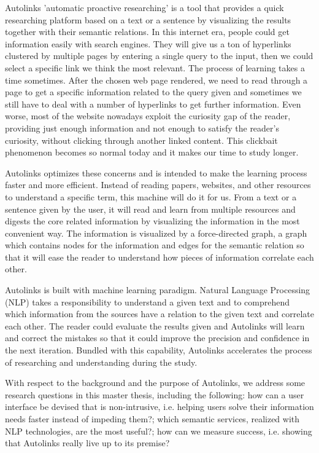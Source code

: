 \documentclass[
    fontsize=12pt,
    headings=small,
    parskip=half,           %
    bibliography=totoc,
    numbers=noenddot,       %
    open=any,               %
    ]{scrreprt}
\begin{document}
 Autolinks 'automatic proactive researching’ is a tool that provides a quick researching platform based on a text or a sentence by visualizing the results together with their semantic relations. In this internet era, people could get information easily with search engines. They will give us a ton of hyperlinks clustered by multiple pages by entering a single query to the input, then we could select a specific link we think the most relevant. The process of learning takes a time sometimes. After the chosen web page rendered, we need to read through a page to get a specific information related to the query given and sometimes we still have to deal with a number of hyperlinks to get further information. Even worse, most of the website nowadays exploit the curiosity gap of the reader, providing just enough information and not enough to satisfy the reader’s curiosity, without clicking through another linked content. This clickbait phenomenon becomes so normal today and it makes our time to study longer. 
 
    	Autolinks optimizes these concerns and is intended to make the learning process faster and more efficient. Instead of reading papers, websites, and other resources to understand a specific term, this machine will do it for us. From a text or a sentence given by the user, it will read and learn from multiple resources and digests the core related information by visualizing the information in the most convenient way. The information is visualized by a force-directed graph, a graph which contains nodes for the information and edges for the semantic relation so that it will ease the reader to understand how pieces of information correlate each other.
    	
    	Autolinks is built with machine learning paradigm. Natural Language Processing (NLP) takes a responsibility to understand a given text and to comprehend which information from the sources have a relation to the given text and correlate each other. The reader could evaluate the results given and Autolinks will learn and correct the mistakes so that it could improve the precision and confidence in the next iteration. Bundled with this capability, Autolinks accelerates the process of researching and understanding during the study.  
    	
	With respect to the background and the purpose of Autolinks, we address some research questions in this master thesis, including the following: how can a user interface be devised that is non-intrusive, i.e. helping users solve their information needs faster instead of impeding them?; which semantic services, realized with NLP technologies, are the most useful?; how can we measure success, i.e. showing that Autolinks really live up to its premise?
\end{document}
